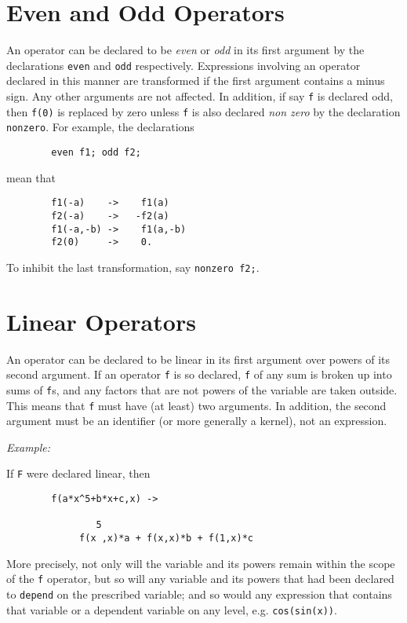 \section{Even and Odd Operators}
\hypertarget{command:EVEN}{}
\hypertarget{command:ODD}{}
\hypertarget{command:NONZERO}{}
An operator can be declared to be \emph{even} or \emph{odd} in its first
argument by the declarations \texttt{even} and
\texttt{odd} respectively.  Expressions involving an operator
declared in this manner are transformed if the first argument contains a
minus sign.  Any other arguments are not affected.  In addition, if say
\texttt{f} is declared odd, then \texttt{f(0)} is replaced by zero unless
\texttt{f} is also declared \emph{non zero} by the declaration
\texttt{nonzero}.
For example, the declarations
\begin{verbatim}
        even f1; odd f2;
\end{verbatim}
mean that
\begin{verbatim}
        f1(-a)    ->    f1(a)
        f2(-a)    ->   -f2(a)
        f1(-a,-b) ->    f1(a,-b)
        f2(0)     ->    0.
\end{verbatim}
To inhibit the last transformation, say \texttt{nonzero f2;}.

\section{Linear Operators}
\hypertarget{command:LINEAR}{}
An operator can be declared to be linear in its first argument over powers
of its second argument.  If an operator \texttt{f} is so declared, \texttt{f} of
any sum is broken up into sums of \texttt{f}s, and any factors that are not
powers of the variable are taken outside.  This means that \texttt{f} must
have (at least) two arguments.  In addition, the second argument must be
an identifier (or more generally a kernel), not an expression.

\textit{Example:}

If \texttt{F} were declared linear, then
\begin{verbatim}
        f(a*x^5+b*x+c,x) ->  

                5
             f(x ,x)*a + f(x,x)*b + f(1,x)*c
\end{verbatim}
More precisely, not only will the variable and its powers remain within the
scope of the \texttt{f} operator, but so will any variable and its powers that
had been declared to \texttt{depend} on the prescribed variable; and so would
any expression that contains that variable or a dependent variable on any
level, e.g. \texttt{cos(sin(x))}.


